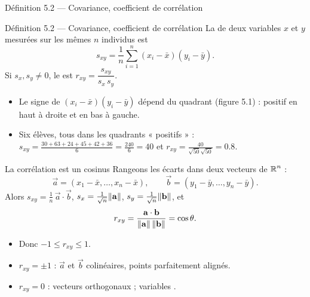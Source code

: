 \begin{frame}{Définition 5.2 --- Covariance, coefficient de corrélation}
  \begin{Enonce}{Définition 5.2 --- Covariance, coefficient de corrélation}
    La  de deux variables $x$ et $y$ mesurées sur les mêmes
    $n$ individus est
    \[
      s_{xy}=\frac1n\sum_{i=1}^n(x_i-\bar x)(y_i-\bar y).
    \]
    Si $s_x,s_y\neq0$, le  est
    $r_{xy}=\dfrac{s_{xy}}{s_x\,s_y}$.
  \end{Enonce}
  \small
  \begin{itemize}
    \item Le signe de $(x_i-\bar x)(y_i-\bar y)$ dépend du quadrant
      (figure 5.1) : positif en haut à droite et en bas à gauche.
    \item Six élèves, tous dans les quadrants « positifs » :
      $s_{xy}=\frac{30+63+24+45+42+36}{6}=\frac{240}{6}=40$ et
      $r_{xy}=\frac{40}{\sqrt{50}\sqrt{50}}=\num{0.8}$.
  \end{itemize}
\end{frame}

\begin{frame}{La corrélation est un cosinus}
  Rangeons les écarts dans deux vecteurs de $\operatorname{\mathbb{R}}^n$ :
  \[
    \vec a=(x_1-\bar x,\dots,x_n-\bar x),\qquad
    \vec b=(y_1-\bar y,\dots,y_n-\bar y).
  \]
  Alors $s_{xy}=\frac1n\,\vec a\cdot\vec b$, $s_x=\frac1{\sqrt n}\lVert \mathbf{a} \rVert$,
  $s_y=\frac1{\sqrt n}\lVert \mathbf{b} \rVert$, et
  \[
    r_{xy}=\frac{\mathbf{a}\cdot\mathbf{b}}{\lVert \mathbf{a} \rVert\,\lVert \mathbf{b} \rVert}=\cos\theta .
  \]
  \begin{itemize}
    \item Donc $-1\leq r_{xy}\leq1$.
    \item $r_{xy}=\pm1$ : $\vec a$ et $\vec b$ colinéaires, points
      parfaitement alignés.
    \item $r_{xy}=0$ : vecteurs orthogonaux ; variables .
  \end{itemize}
\end{frame}

